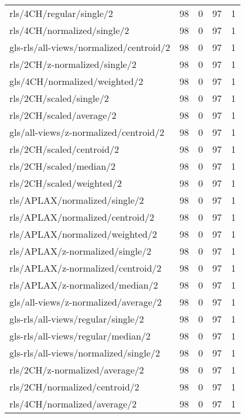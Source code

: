 \begin{longtable}{lrrrr}
    rls/4CH/regular/single/2                  & 98 &  0 & 97 &  1 \\
    rls/4CH/normalized/single/2               & 98 &  0 & 97 &  1 \\
    gls-rls/all-views/normalized/centroid/2   & 98 &  0 & 97 &  1 \\
    rls/2CH/z-normalized/single/2             & 98 &  0 & 97 &  1 \\
    gls/4CH/normalized/weighted/2             & 98 &  0 & 97 &  1 \\
    rls/2CH/scaled/single/2                   & 98 &  0 & 97 &  1 \\
    rls/2CH/scaled/average/2                  & 98 &  0 & 97 &  1 \\
    gls/all-views/z-normalized/centroid/2     & 98 &  0 & 97 &  1 \\
    rls/2CH/scaled/centroid/2                 & 98 &  0 & 97 &  1 \\
    rls/2CH/scaled/median/2                   & 98 &  0 & 97 &  1 \\
    rls/2CH/scaled/weighted/2                 & 98 &  0 & 97 &  1 \\
    rls/APLAX/normalized/single/2             & 98 &  0 & 97 &  1 \\
    rls/APLAX/normalized/centroid/2           & 98 &  0 & 97 &  1 \\
    rls/APLAX/normalized/weighted/2           & 98 &  0 & 97 &  1 \\
    rls/APLAX/z-normalized/single/2           & 98 &  0 & 97 &  1 \\
    rls/APLAX/z-normalized/centroid/2         & 98 &  0 & 97 &  1 \\
    rls/APLAX/z-normalized/median/2           & 98 &  0 & 97 &  1 \\
    gls/all-views/z-normalized/average/2      & 98 &  0 & 97 &  1 \\
    gls-rls/all-views/regular/single/2        & 98 &  0 & 97 &  1 \\
    gls-rls/all-views/regular/median/2        & 98 &  0 & 97 &  1 \\
    gls-rls/all-views/normalized/single/2     & 98 &  0 & 97 &  1 \\
    rls/2CH/z-normalized/average/2            & 98 &  0 & 97 &  1 \\
    rls/2CH/normalized/centroid/2             & 98 &  0 & 97 &  1 \\
    rls/4CH/normalized/average/2              & 98 &  0 & 97 &  1 \\

\end{longtable}
